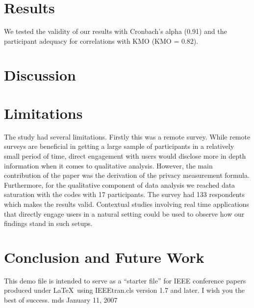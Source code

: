 \documentclass[conference]{IEEEtran}
\begin{document}
\section {Results}

We tested the validity of our results with Cronbach's alpha (0.91) and the participant adequacy for correlations with KMO (KMO = 0.82). 

\section{Discussion}

\section {Limitations}

The study had several limitations. Firstly this was a remote survey. While remote surveys are beneficial in getting a large sample of participants in a relatively small period of time, direct engagement with users would disclose more in depth information when it comes to qualitative analysis. However, the main contribution of the paper was the derivation of the privacy measurement formula. Furthermore, for the qualitative component of data analysis we reached data saturation with the codes with 17 participants. The survey had 133 respondents which makes the results valid. Contextual studies involving real time applications that directly engage users in a natural setting could be used to observe how our findings stand in such setups.



\section{Conclusion and Future Work}




\iffalse

\begin{figure} 
\centering
\includegraphics [height=2 in,width=3 in]{Figure2.pdf}
\caption{Answer structure in a given security question \protect}
\vskip -6pt
\end{figure}
\fi

\iffalse 
Lying to a human being is a very bad thing to do, but, what if one lying to a computer to protect her privacy and keep her safe. 
\fi


\iffalse 
This demo file is intended to serve as a ``starter file''
for IEEE conference papers produced under \LaTeX\ using
IEEEtran.cls version 1.7 and later.
I wish you the best of success. 
\hfill mds
\hfill January 11, 2007
\end{document}
